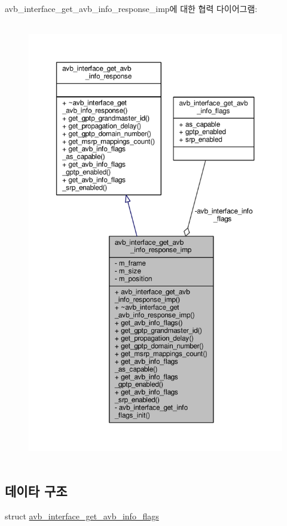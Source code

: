 avb\+\_\+interface\+\_\+get\+\_\+avb\+\_\+info\+\_\+response\+\_\+imp에 대한 협력 다이어그램\+:
\nopagebreak
\begin{figure}[H]
\begin{center}
\leavevmode
\includegraphics[height=550pt]{classavdecc__lib_1_1avb__interface__get__avb__info__response__imp__coll__graph}
\end{center}
\end{figure}
\subsection*{데이타 구조}
\begin{DoxyCompactItemize}
\item 
struct \hyperlink{structavdecc__lib_1_1avb__interface__get__avb__info__response__imp_1_1avb__interface__get__avb__info__flags}{avb\+\_\+interface\+\_\+get\+\_\+avb\+\_\+info\+\_\+flags}
\end{DoxyCompactItemize}
